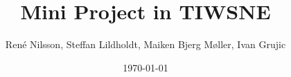 \documentclass[]{report}
\begin{document}
\title{Mini Project in TIWSNE}
\author{René Nilsson, Steffan Lildholdt, Maiken Bjerg Møller, Ivan Grujic}
\date{\today}
\maketitle
{}


\end{document}
